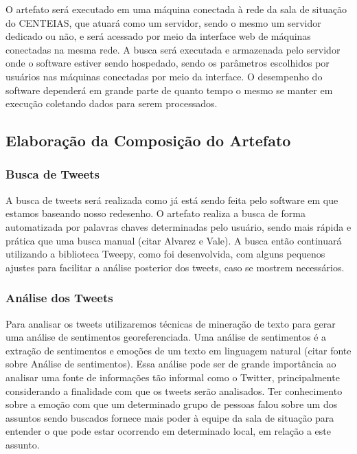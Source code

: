 \documentclass[12pt]{article}
\newcommand{\rascbegin}{\color{red}}    %
\newcommand{\rascend}{\color{black}}    %
\begin{document}
    O artefato será executado em uma máquina conectada à rede da sala de situação do CENTEIAS, que atuará como um servidor, sendo o mesmo um servidor dedicado ou não, e será acessado por meio da interface web de máquinas conectadas na mesma rede. A busca será executada e armazenada pelo servidor onde o software estiver sendo hospedado, sendo os parâmetros escolhidos por usuários nas máquinas conectadas por meio da interface. O desempenho do software dependerá em grande parte de quanto tempo o mesmo se manter em execução coletando dados para serem processados.
    
    \subsection{Elaboração da Composição do Artefato}
    \subsubsection{Busca de Tweets}
    A busca de tweets será realizada como já está sendo feita pelo software em que estamos baseando nosso redesenho. O artefato realiza a busca de forma automatizada por palavras chaves determinadas pelo usuário, sendo mais rápida e prática que uma busca manual \rascbegin(citar Alvarez e Vale)\rascend. A busca então continuará utilizando a biblioteca Tweepy, como foi desenvolvida, com alguns pequenos ajustes para facilitar a análise posterior dos tweets, caso se mostrem necessários.
    
    \subsubsection{Análise dos Tweets}
    Para analisar os tweets utilizaremos técnicas de mineração de texto para gerar uma análise de sentimentos georeferenciada. Uma análise de sentimentos é a extração de sentimentos e emoções de um texto em linguagem natural \rascbegin(citar fonte sobre Análise de sentimentos)\rascend. Essa análise pode ser de grande importância ao analisar uma fonte de informações tão informal como o Twitter, principalmente considerando a finalidade com que os tweets serão analisados. Ter conhecimento sobre a emoção com que um determinado grupo de pessoas falou sobre um dos assuntos sendo buscados fornece mais poder à equipe da sala de situação para entender o que pode estar ocorrendo em determinado local, em relação a este assunto.
    
\end{document}
